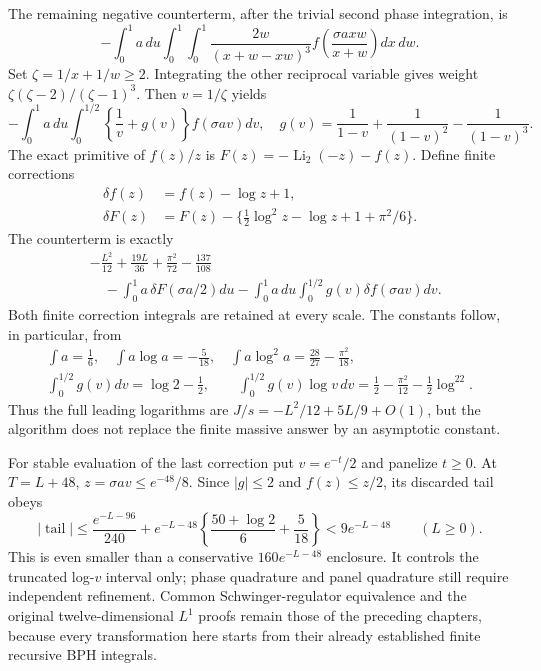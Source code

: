 The remaining negative counterterm, after the trivial second phase
integration, is
\[
 -\int_0^1a\,du\int_0^1\int_0^1
       \frac{2w}{(x+w-xw)^3}
       f\left(\frac{\sigma a xw}{x+w}\right)dx\,dw.
\]
Set $\zeta=1/x+1/w\ge2$. Integrating the other reciprocal variable
gives weight $\zeta(\zeta-2)/(\zeta-1)^3$. Then $v=1/\zeta$ yields
\[
 -\int_0^1a\,du\int_0^{1/2}
       \left\{\frac1v+g(v)\right\}f(\sigma av)dv,
 \quad
 g(v)=\frac1{1-v}+\frac1{(1-v)^2}-\frac1{(1-v)^3}.
\]
The exact primitive of $f(z)/z$ is
$F(z)=-\operatorname{Li}_2(-z)-f(z)$. Define finite corrections
\begin{align*}
 \delta f(z)&=f(z)-\log z+1,\\
 \delta F(z)&=F(z)-\{\tfrac12\log^2z-\log z+1+\pi^2/6\}.
\end{align*}
The counterterm is exactly
\begin{align*}
 &-\frac{L^2}{12}+\frac{19L}{36}+\frac{\pi^2}{72}-\frac{137}{108}\\
 &\quad-\int_0^1a\,\delta F(\sigma a/2)du
       -\int_0^1a\,du\int_0^{1/2}g(v)\delta f(\sigma av)dv.
\end{align*}
Both finite correction integrals are retained at every scale. The constants
follow, in particular, from
\begin{gather*}
 \int a=\tfrac16,\quad \int a\log a=-\tfrac5{18},\quad
 \int a\log^2a=\tfrac{28}{27}-\tfrac{\pi^2}{18},\\
 \int_0^{1/2}g(v)dv=\log2-\tfrac12,\qquad
 \int_0^{1/2}g(v)\log v\,dv=\tfrac12-\tfrac{\pi^2}{12}
                                             -\tfrac12\log^22.
\end{gather*}
Thus the full leading logarithms are
$J/s=-L^2/12+5L/9+O(1)$, but the algorithm does not replace the finite
massive answer by an asymptotic constant.

For stable evaluation of the last correction put $v=e^{-t}/2$ and panelize
$t\ge0$. At $T=L+48$, $z=\sigma av\le e^{-48}/8$. Since $|g|\le2$
and $f(z)\le z/2$, its discarded tail obeys
\[
 |\operatorname{tail}|
 \le\frac{e^{-L-96}}{240}
 +e^{-L-48}\left\{\frac{50+\log2}{6}+\frac5{18}\right\}
 <9e^{-L-48}\qquad(L\ge0).
\]
This is even smaller than a conservative $160e^{-L-48}$ enclosure.
It controls the truncated log-$v$ interval only; phase quadrature and panel
quadrature still require independent refinement. Common Schwinger-regulator
equivalence and the original twelve-dimensional $L^1$ proofs remain those
of the preceding chapters, because every transformation here starts from
their already established finite recursive BPH integrals.

